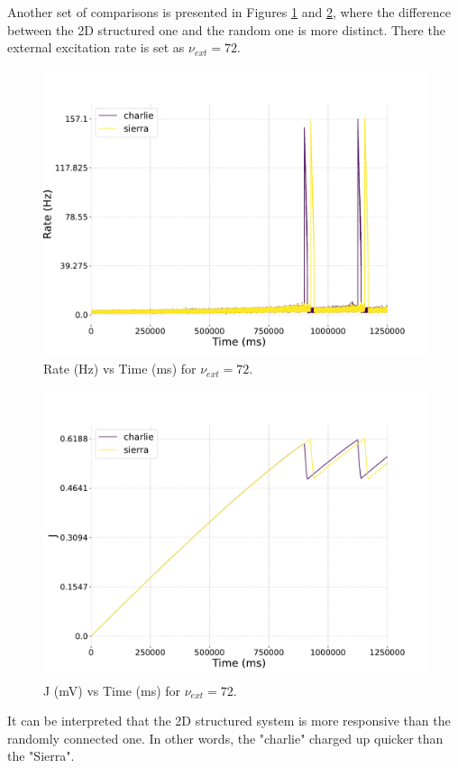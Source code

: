 \documentclass[a4paper,12pt]{article}
\begin{document}
Another set of comparisons is presented in Figures \ref{charlie72ratevstime} and \ref{charlie72alphavstime}, where the difference between the 2D structured one and the random one is more distinct. There the external excitation rate is set as $\nu_{ext} =  72.$
\begin{figure}[H] 
    \centering
    \includegraphics[width=0.8\linewidth]{nu_ext_72rate_over_time_homeostasis.pdf}
    \caption{Rate (Hz) vs Time (ms) for $\nu_{ext} = 72$.}
    \label{charlie72ratevstime}
\end{figure}
\begin{figure}[H] 
    \centering
    \includegraphics[width=0.8\linewidth]{nu_ext_72alpha_over_time_homeostasis.pdf}
    \caption{J (mV) vs Time (ms) for $\nu_{ext} = 72$.}
    \label{charlie72alphavstime}
\end{figure}
It can be interpreted that the 2D structured system is more responsive than the randomly connected one. In other words, the "charlie" charged up quicker than the "Sierra".
\end{document}
